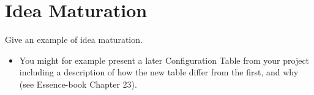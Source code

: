 \section{Idea Maturation}
Give an example of idea maturation.
\begin{itemize}
\item You might for example present a later Configuration Table from your project including a description of how the new table differ from the first, and why (see Essence-book Chapter 23).
\end{itemize}